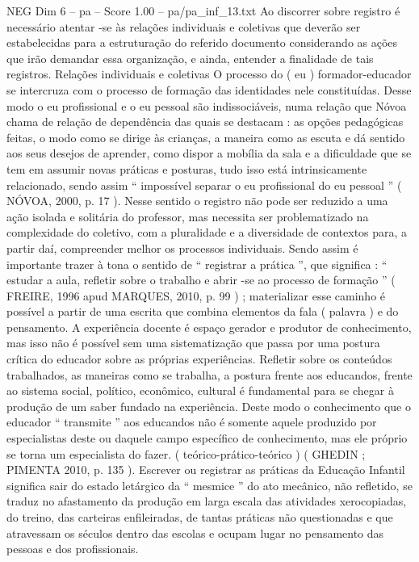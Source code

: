 \begin{textsample}{NEG Dim 6 – pa – Score 1.00 – pa/pa\_inf\_13.txt}
Ao discorrer sobre registro é necessário atentar -se às relações individuais e coletivas que deverão ser estabelecidas para a estruturação do referido documento considerando as ações que irão demandar essa organização, e ainda, entender a finalidade de tais registros.
Relações individuais e coletivas O processo do ( eu ) formador-educador se intercruza com o processo de formação das identidades nele constituídas.
Desse modo o eu profissional e o eu pessoal são indissociáveis, numa relação que Nóvoa chama de relação de dependência das quais se destacam : as opções pedagógicas feitas, o modo como se dirige às crianças, a maneira como as escuta e dá sentido aos seus desejos de aprender, como dispor a mobília da sala e a dificuldade que se tem em assumir novas práticas e posturas, tudo isso está intrinsicamente relacionado, sendo assim “ impossível separar o eu profissional do eu pessoal ” ( NÓVOA, 2000, p. 17 ).
Nesse sentido o registro não pode ser reduzido a uma ação isolada e solitária do professor, mas necessita ser problematizado na complexidade do coletivo, com a pluralidade e a diversidade de contextos para, a partir daí, compreender melhor os processos individuais.
Sendo assim é importante trazer à tona o sentido de “ registrar a prática ”, que significa : “ estudar a aula, refletir sobre o trabalho e abrir -se ao processo de formação ” ( FREIRE, 1996 apud MARQUES, 2010, p. 99 ) ; materializar esse caminho é possível a partir de uma escrita que combina elementos da fala ( palavra ) e do pensamento.
A experiência docente é espaço gerador e produtor de conhecimento, mas isso não é possível sem uma sistematização que passa por uma postura crítica do educador sobre as próprias experiências.
Refletir sobre os conteúdos trabalhados, as maneiras como se trabalha, a postura frente aos educandos, frente ao sistema social, político, econômico, cultural é fundamental para se chegar à produção de um saber fundado na experiência.
Deste modo o conhecimento que o educador “ transmite ” aos educandos não é somente aquele produzido por especialistas deste ou daquele campo específico de conhecimento, mas ele próprio se torna um especialista do fazer. ( teórico-prático-teórico ) ( GHEDIN ; PIMENTA 2010, p. 135 ).
Escrever ou registrar as práticas da Educação Infantil significa sair do estado letárgico da “ mesmice ” do ato mecânico, não refletido, se traduz no afastamento da produção em larga escala das atividades xerocopiadas, do treino, das carteiras enfileiradas, de tantas práticas não questionadas e que atravessam os séculos dentro das escolas e ocupam lugar no pensamento das pessoas e dos profissionais.

\end{textsample}
